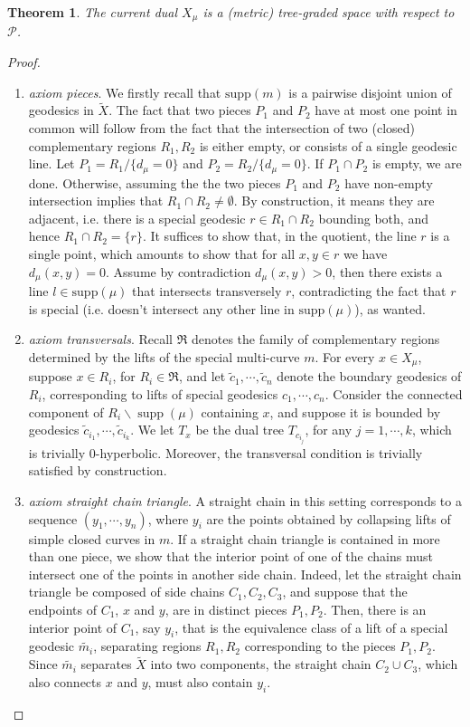 \documentclass[12pt,article]{amsart}
\numberwithin{equation}{section}
\numberwithin{figure}{section}
\newtheorem{theorem}[equation]{Theorem}
\theoremstyle{definition}
\theoremstyle{plain}
\newcommand*{\wt}[1]{\widetilde{#1}}
\DeclareMathOperator{\supp}{supp}
\begin{document}
\begin{theorem}
\label{thm:decomposition}
The current dual $X_\mu$ is a (metric) tree-graded space with respect to $\mathcal{P}$.
\end{theorem}
\begin{proof}
\begin{enumerate}
\item \emph{axiom pieces}. We firstly recall that $\mathrm{supp}(m)$ is a pairwise disjoint union of geodesics in $\wt{X}$. The fact that two pieces $P_1$ and $P_2$ have at most one point in common will follow from the fact that the intersection of two (closed) complementary regions $R_1 , R_2$ is either empty, or consists of a single geodesic line. Let $P_1 = R_1 / {\{d_\mu = 0\}}$ and $P_2 = R_2 / {\{d_\mu = 0\}}$. If $P_1 \cap P_2$ is empty, we are done. Otherwise, assuming the the two pieces $P_1$ and $P_2$ have non-empty intersection implies that $R_1 \cap R_2 \neq \emptyset$. By construction, it means they are adjacent, i.e. there is a special geodesic $r \in R_1 \cap R_2$ bounding both, and hence $R_1 \cap R_2 = \{r \}$. It suffices to show that, in the quotient, the line $r$ is a single point, which amounts to show that for all $x, y \in r$ we have $d_\mu (x,y) =0$. Assume by contradiction $d_\mu (x, y) > 0$, then there exists a line $l \in \mathrm{supp} (\mu)$ that intersects transversely $r$, contradicting the fact that $r$ is special (i.e. doesn't intersect any other line in $\mathrm{supp}(\mu)$), as wanted.
\item \emph{axiom transversals}. Recall $\mathfrak{R}$ denotes the family of complementary regions determined by the lifts of the special multi-curve $m$. For every $x \in X_{\mu}$, suppose $x \in R_i$, for $R_i \in  \mathfrak{R}$, and let $\wt{c}_1,\cdots, \wt{c}_n$ denote the boundary geodesics of $R_i$, corresponding to lifts of special geodesics $c_1,\cdots,c_n$. Consider the connected component of $R_i \backslash \supp(\mu)$ containing $x$, and suppose it is bounded by geodesics $\wt{c}_{i_1},\cdots, \wt{c}_{i_k}$.  We let $T_x$ be the dual tree $T_{c_{i_j}}$, for any $j=1,\cdots,k$, which is trivially $0$-hyperbolic. Moreover, the transversal condition is trivially satisfied by construction.
\item \emph{axiom straight chain triangle}. A straight chain in this setting corresponds to a sequence $(y_1,\cdots,y_n)$, where $y_i$ are the points obtained by collapsing lifts of simple closed curves in $m$.
If a straight chain triangle is contained in more than one piece, we show that the interior point of one of the chains must intersect one of the points in another side chain. Indeed, let the straight chain triangle be composed of side chains $C_1,C_2,C_3$, and suppose that the endpoints of $C_1$, $x$ and $y$, are in distinct pieces $P_1, P_2$. Then, there is an interior point of $C_1$, say $y_i$, that is the equivalence class of a lift of a special geodesic $\wt{m_i}$, separating regions $R_1,R_2$ corresponding to the pieces $P_1,P_2$.
Since $\wt{m_i}$ separates $\wt{X}$ into two components, the straight chain $C_2 \cup C_3$, which also connects $x$ and $y$, must also contain $y_i$.

\end{enumerate}
\end{proof}
\end{document}
